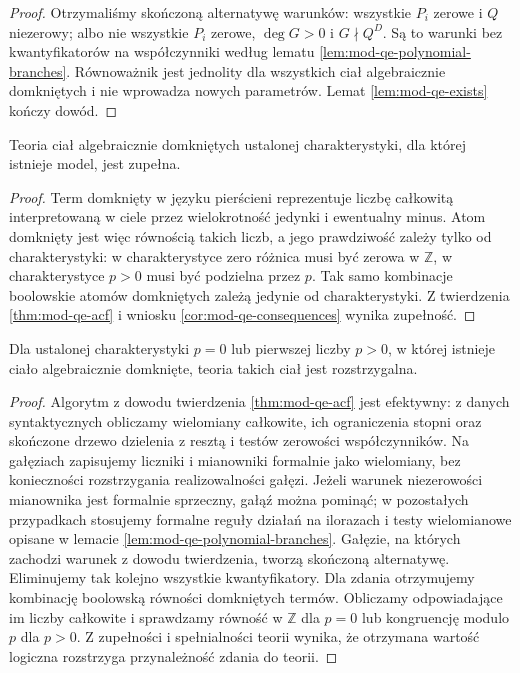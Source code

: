 \begin{proof}
Otrzymaliśmy skończoną alternatywę warunków:
wszystkie $P_i$ zerowe i $Q$ niezerowy; albo nie
wszystkie $P_i$ zerowe, $\deg G>0$ i
$G\nmid Q^D$. Są to warunki bez kwantyfikatorów
na współczynniki według lematu
\ref{lem:mod-qe-polynomial-branches}.
Równoważnik jest jednolity dla wszystkich ciał
algebraicznie domkniętych i nie wprowadza nowych
parametrów. Lemat \ref{lem:mod-qe-exists} kończy dowód.
\end{proof}

\begin{wniosek}
\label{cor:mod-qe-acf-complete}
Teoria ciał algebraicznie domkniętych ustalonej
charakterystyki, dla której istnieje model, jest zupełna.
\end{wniosek}
\begin{proof}
Term domknięty w języku pierścieni reprezentuje
liczbę całkowitą interpretowaną w ciele przez wielokrotność
jedynki i ewentualny minus. Atom domknięty jest więc
równością takich liczb, a jego prawdziwość zależy
tylko od charakterystyki: w charakterystyce zero
różnica musi być zerowa w $\mathbb Z$, w charakterystyce
$p>0$ musi być podzielna przez $p$. Tak samo kombinacje
boolowskie atomów domkniętych zależą jedynie od
charakterystyki. Z twierdzenia \ref{thm:mod-qe-acf}
i wniosku \ref{cor:mod-qe-consequences} wynika zupełność.
\end{proof}

\begin{wniosek}
\label{cor:mod-qe-acf-decidable}
Dla ustalonej charakterystyki $p=0$ lub pierwszej
liczby $p>0$, w której istnieje ciało algebraicznie
domknięte, teoria takich ciał jest rozstrzygalna.
\end{wniosek}
\begin{proof}
Algorytm z dowodu twierdzenia \ref{thm:mod-qe-acf}
jest efektywny: z danych syntaktycznych obliczamy
wielomiany całkowite, ich ograniczenia stopni
oraz skończone drzewo dzielenia z resztą i testów
zerowości współczynników. Na gałęziach zapisujemy
liczniki i mianowniki formalnie jako wielomiany,
bez konieczności rozstrzygania realizowalności
gałęzi. Jeżeli warunek niezerowości mianownika
jest formalnie sprzeczny, gałąź można pominąć;
w pozostałych przypadkach stosujemy formalne reguły
działań na ilorazach i testy wielomianowe opisane
w lemacie \ref{lem:mod-qe-polynomial-branches}.
Gałęzie, na których zachodzi warunek z dowodu
twierdzenia, tworzą skończoną alternatywę.
Eliminujemy tak kolejno wszystkie kwantyfikatory.
Dla zdania otrzymujemy kombinację boolowską
równości domkniętych termów. Obliczamy odpowiadające
im liczby całkowite i sprawdzamy równość w $\mathbb Z$
dla $p=0$ lub kongruencję modulo $p$ dla $p>0$.
Z zupełności i spełnialności teorii wynika, że
otrzymana wartość logiczna rozstrzyga przynależność
zdania do teorii.
\end{proof}

